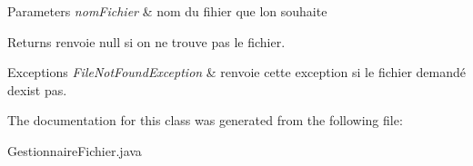 \begin{DoxyParams}{Parameters}
{\em nom\+Fichier} & nom du fihier que l\textquotesingle{}on souhaite \\
\hline
\end{DoxyParams}
\begin{DoxyReturn}{Returns}
renvoie null si on ne trouve pas le fichier. 
\end{DoxyReturn}

\begin{DoxyExceptions}{Exceptions}
{\em File\+Not\+Found\+Exception} & renvoie cette exception si le fichier demandé d\textquotesingle{}exist pas. \\
\hline
\end{DoxyExceptions}


The documentation for this class was generated from the following file\+:\begin{DoxyCompactItemize}
\item 
Gestionnaire\+Fichier.\+java\end{DoxyCompactItemize}
